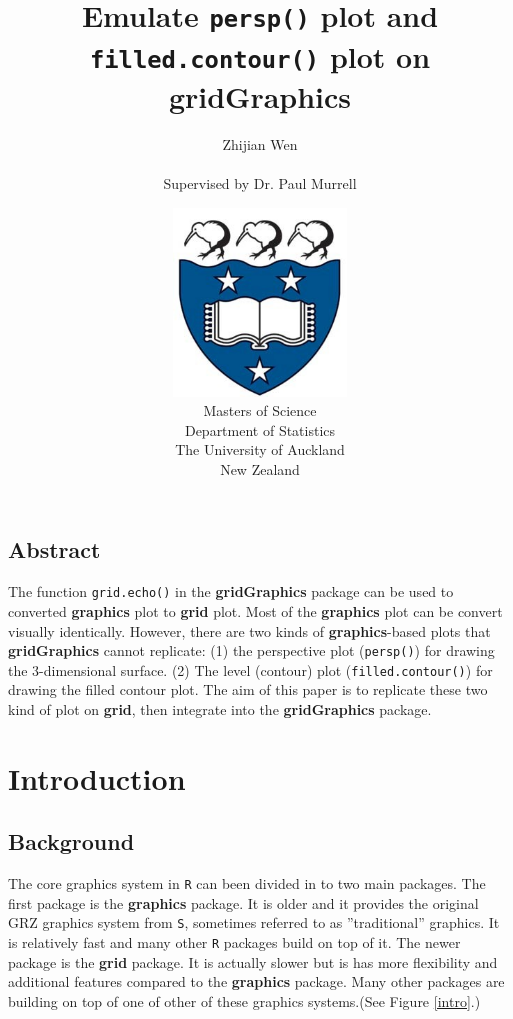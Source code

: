 \documentclass[paper=a4, fontsize=11pt]{report}
\title{\huge{Emulate \texttt{persp()} plot and \texttt{filled.contour()} plot on \textbf{gridGraphics}}}
\author{\Large{Zhijian Wen} \\ \\ \Large{Supervised by Dr. Paul Murrell}}
\date
{
\vspace{3cm}
\includegraphics[height = 5cm, width = 5cm]{logo.jpg}\\
\vspace{1cm}
Masters of Science\\
Department of Statistics\\
The University of Auckland\\
New Zealand
}
\begin{document}

\setlength{\parindent}{0}
\noindent

\maketitle
\tableofcontents
\listoffigures

\newpage
\section*{Abstract}
The function \texttt{grid.echo()} in the \textbf{gridGraphics} package can be used to converted \textbf{graphics} plot to \textbf{grid} plot. Most of the \textbf{graphics} plot can be convert visually identically. However, there are two kinds of \textbf{graphics}-based plots that \textbf{gridGraphics} cannot replicate: (1) the perspective plot (\texttt{persp()}) for drawing the 3-dimensional surface. (2) The level (contour) plot (\texttt{filled.contour()}) for drawing the filled contour plot. The aim of this paper is to replicate these two kind of plot on \textbf{grid}, then integrate into the \textbf{gridGraphics} package.

\chapter{Introduction}
\section{Background}
The core graphics system in \texttt{R} can been divided in to two main packages. The first package is the \textbf{graphics} package. It is older and it provides the original GRZ graphics system from \texttt{S}, sometimes referred to as ''traditional'' graphics. It is relatively fast and many other \texttt{R} packages build on top of it. The newer package is the \textbf{grid} package. It is actually slower but is has more flexibility and additional features compared to the \textbf{graphics} package. Many other packages are building on top of one of other of these graphics systems.(See Figure \ref{intro}.)\\
\end{document}

